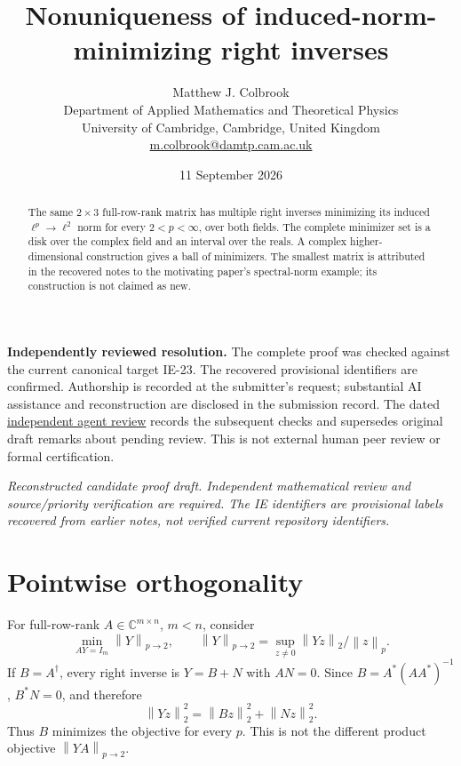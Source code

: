 \documentclass[11pt]{article}
\title{Nonuniqueness of induced-norm-minimizing right inverses}
\author{Matthew J. Colbrook\\\small Department of Applied Mathematics and Theoretical Physics\\\small University of Cambridge, Cambridge, United Kingdom\\\small\href{mailto:m.colbrook@damtp.cam.ac.uk}{m.colbrook@damtp.cam.ac.uk}}
\date{11 September 2026}
\newcommand{\C}{\mathbb C}
\newcommand{\norm}[1]{\left\lVert#1\right\rVert}
\begin{document}
\maketitle

\noindent\textbf{Independently reviewed resolution.} The complete proof was checked against the current canonical target IE-23. The recovered provisional identifiers are confirmed. Authorship is recorded at the submitter's request; substantial AI assistance and reconstruction are disclosed in the submission record.
The dated \href{https://github.com/MColbrook/OpenProblemsInNLA/blob/codex/colbrook-recovered-submissions/references/colbrook-recovered-2026-09-11/verification/reviews/IE-23-review.md}{independent agent review} records the subsequent checks and supersedes original draft remarks about pending review. This is not external human peer review or formal certification.
\par\medskip

\noindent\textit{Reconstructed candidate proof draft. Independent mathematical review and source/priority verification are required. The IE identifiers are provisional labels recovered from earlier notes, not verified current repository identifiers.}


\begin{abstract}
The same $2\times3$ full-row-rank matrix has multiple right inverses minimizing its induced $\ell^p\to\ell^2$ norm for every $2<p<\infty$, over both fields. The complete minimizer set is a disk over the complex field and an interval over the reals. A complex higher-dimensional construction gives a ball of minimizers. The smallest matrix is attributed in the recovered notes to the motivating paper's spectral-norm example; its construction is not claimed as new.
\end{abstract}
\section{Pointwise orthogonality}
For full-row-rank $A\in\C^{m\times n}$, $m<n$, consider
\[\min_{AY=I_m}\norm Y_{p\to2},\qquad \norm Y_{p\to2}=\sup_{z\ne0}\norm{Yz}_2/\norm z_p.\]
If $B=A^\dagger$, every right inverse is $Y=B+N$ with $AN=0$. Since $B=A^*(AA^*)^{-1}$, $B^*N=0$, and therefore
\[\norm{Yz}_2^2=\norm{Bz}_2^2+\norm{Nz}_2^2.\]
Thus $B$ minimizes the objective for every $p$. This is not the different product objective $\norm{YA}_{p\to2}$.
\end{document}
